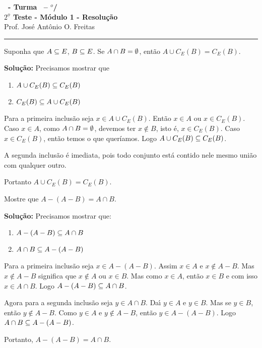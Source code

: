 \documentclass[12pt]{exam}
\begin{document}
\begin{center}
{\Large\bf \disciplina\ - Turma \turma\ -- \semestre$^{o}$/\ano} \\ \vspace{9pt} {\large\bf
$2^{\underline{o}}$ Teste - M\'odulo 1 - Resolu\c{c}\~ao}\\
\vspace{9pt} Prof. Jos{\'e} Ant{\^o}nio O. Freitas
\end{center}
\hrule

\vspace{.6cm}

\questao Suponha que $A \subseteq E$, $B \subseteq E$. Se $A \cap B = \emptyset$, então $A \cup C_E(B) = C_E(B)$.

\noindent\textbf{Solu\c{c}\~ao:} Precisamos mostrar que
\begin{enumerate}[label={\roman*})]
    \item $A \cup C_E(B) \subseteq C_E(B)$
    \item $C_E(B) \subseteq A \cup C_E(B)$
\end{enumerate}

Para a primeira inclusão seja $x \in A \cup C_E(B)$. Então $x \in A$ ou $x \in C_E(B)$. Caso $x \in A$, como $A \cap B = \emptyset$, devemos ter $x \notin B$, isto é, $x \in C_E(B)$. Caso $x \in C_E(B)$, então temos o que queríamos. Logo $A \cup C_E(B) \subseteq C_E(B)$.

A segunda inclusão é imediata, pois todo conjunto está contido nele mesmo união com qualquer outro.

Portanto $A \cup C_E(B) = C_E(B)$.

\vspace{.5cm}

\questao Mostre que $A - (A - B) = A \cap B$.

\noindent\textbf{Solu\c{c}\~ao:} Precisamos mostrar que:
\begin{enumerate}[label={\roman*})]
	\item $A - (A - B) \subseteq A \cap B$
	\item $A \cap B \subseteq A - (A - B)$
\end{enumerate}

Para a primeira inclus\~ao seja $x \in A - (A - B)$. Assim $x \in A$ e $x \notin A - B$. Mas $x \notin A - B$ significa que $x \notin A$ ou $x \in B$. Mas como $x \in A$, então $x \in B$ e com isso $x \in A \cap B$. Logo $A - (A - B) \subseteq A \cap B$.

Agora para a segunda inclus\~ao seja $y \in A \cap B$. Da{\'\i} $y \in A$ e $y \in B$. Mas se $y \in B$, então $y \notin A - B$. Como $y \in A$ e $y \notin A - B$, então $y \in A - (A - B)$. Logo $A \cap B \subseteq A - (A - B)$.

Portanto, $A - (A - B) = A \cap B$.
\end{document}
